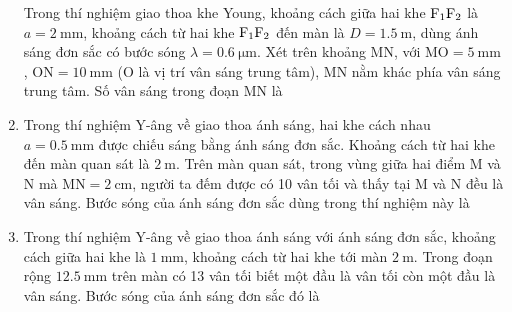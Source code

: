 \begin{enumerate}
	{
		Trong thí nghiệm giao thoa khe Young, khoảng cách giữa hai khe $\text F _1 \text F_2$ là $a=\SI{2}{\milli \meter}$, khoảng cách từ hai khe $\text F_1 \text F_2$ đến màn là $D=\SI{1.5}{\meter}$, dùng ánh sáng đơn sắc có bước sóng $\lambda=\SI{0.6}{\micro \meter}$. Xét trên khoảng MN, với $\text{MO}=\SI{5}{\milli \meter}$, $\text{ON}=\SI{10}{\milli \meter}$ (O là vị trí vân sáng trung tâm), MN nằm khác phía vân sáng trung tâm. Số vân sáng trong đoạn MN là
	}
	\item
	{
		Trong thí nghiệm Y-âng về giao thoa ánh sáng, hai khe cách nhau $a=\SI{0.5}{\milli \meter}$ được chiếu sáng bằng ánh sáng đơn sắc. Khoảng cách từ hai khe đến màn quan sát là $\SI{2}{\meter}$. Trên màn quan sát, trong vùng giữa hai điểm M và N mà $\text{MN}=\SI{2}{\centi \meter}$, người ta đếm được có 10 vân tối và thấy tại M và N đều là vân sáng. Bước sóng của ánh sáng đơn sắc dùng trong thí nghiệm này là
	}
	\item
	{
		Trong thí nghiệm Y-âng về giao thoa ánh sáng với ánh sáng đơn sắc, khoảng cách giữa hai khe là $\SI{1}{\milli \meter}$, khoảng cách từ hai khe tới màn $\SI{2}{\meter}$. Trong đoạn rộng $\SI{12.5}{\milli \meter}$ trên màn có 13 vân tối biết một đầu là vân tối còn một đầu là vân sáng. Bước sóng của ánh sáng đơn sắc đó là
	}
\end{enumerate}
